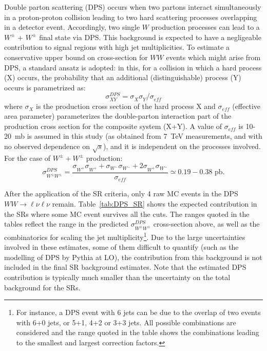 Double parton scattering (DPS) occurs when two partons interact simultaneously in a proton-proton collision leading to two hard scattering 
processes overlapping in a detector event. 
Accordingly, two single $W$ production processes can lead to a $W^\pm$ + $W^\pm$ final state via DPS. 
This background is expected to have a negligeable contribution to signal regions with high jet multiplicities.
To estimate a conservative upper bound on cross-section for $WW$ events which might arise from DPS, a standard ansatz is adopted: 
in this, for a collision in which a hard process (X) occurs, the probability that 
an additional (distinguishable) process (Y) occurs is parametrized as:
\begin{equation}
\sigma^{DPS}_{XY} = \sigma^{}_{X}\sigma^{}_{Y}/\sigma^{}_{eff}
\end{equation} 
where $\sigma^{}_{X}$ is the production cross section of the hard 
process X and $\sigma^{}_{eff}$ (effective area parameter) 
parameterizes the double-parton interaction part of the production 
cross section for the composite system (X+Y). 
A value of $\sigma^{}_{eff}$ is 10-20~mb is assumed in this study (as obtained from 7~TeV measurements, and with no observed dependence on $\sqrt{s}$), and it is independent on the processes involved. For the case of $W^\pm+W^\pm$ production:
\begin{equation}
\sigma^{DPS}_{W^\pm W^\pm} = \frac{ \sigma^{}_{W^+}\sigma^{}_{W^+} + \sigma^{}_{W^-}\sigma^{}_{W^-} + 2\sigma^{}_{W^+}\sigma^{}_{W^-}}{\sigma^{}_{eff} } \simeq 0.19-0.38\text{ pb.}
\end{equation} 

After the application of the SR criteria, only 4 raw MC events in the DPS $WW\to\ell\nu\ell\nu$ remain. 
Table~\ref{tab:DPS_SR} shows the expected contribution in the SRs where some MC event survives all the cuts. The ranges quoted in the tables reflect the range in the predicted $\sigma^{DPS}_{W^\pm W^\pm}$ cross-section above, as well as the combinatorics for scaling the jet multiplicity\footnote{For instance, a DPS event with 6 jets can be due to the overlap of two events with 6+0 jets, or 5+1, 4+2 or 3+3 jets. All possible combinations are considered and the range quoted in the table shows the combinations leading to the smallest and largest correction factors.}.
Due to the large uncertainties involved in these estimates, some of them difficult to quantify (such as the modelling of DPS by {\sc Pythia} at LO), the contribution from this background is not included in the final SR background estimates. 
Note that the estimated DPS contribution is typically much smaller than the uncertainty on the total background for the SRs.

